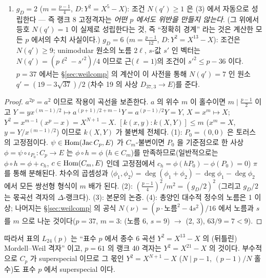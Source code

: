 \begin{proposition}[몫곡선 사전]
\begin{enumerate}
\item $g_D=2$ ($m=\tfrac{p-1}4$, $D:Y^2=X^5-X$): 조건 $N(q')\ge1$ 은 (3) 에서 자동으로 성립한다 --- 즉 랭크 8 고정격자는 \emph{어떤 $p$ 에서도 위반을 만들지 않는다}. (그 위에서 등호 $N(q')=1$ 이 실제로 성립한다는 것, 즉 ``정확히 경계'' 라는 것은 계산한 모든 $p$ 에서의 수치 사실이다.) $g_D=6$ ($m=\tfrac{p-1}{12}$, $D:Y^2=X^{13}-X$): 조건은 $N(q')\ge9$; unimodular 원소의 노름 $2\ell$, $s$-값 $s'$ 인 벡터는 $N(q')=(p\ell^2-s'^2)/4$ 이므로 근($\ell=1$)의 조건이 $s'^2\le p-36$ 이다. $p=37$ 에서는 \S\ref{sec:weilcomp} 의 계산이 이 사전을 통해 $N(q')=7$ 인 원소 $q'=(19-3\sqrt{37})/2$ (차수 19 의 사상 $D_{37,3}\to E$)를 준다.
\end{enumerate}
\end{proposition}
\begin{proof}
$a^{2p}=a^2$ 이므로 작용이 곡선을 보존한다. $a$ 의 위수 $m$ 이 홀수이면 $m\mid\tfrac{p-1}2$ 이고 $Y=yx^{(m-1)/2}\mapsto a^{(p+1)/2+m-1}Y=a^{(p-1)/2}Y=Y$, $X=x^m\mapsto X$; $Y^2=x^{m-1}(x^p-x)=X^{N+1}-X$. $[k(x,y):k(X,Y)]\le m$ ($x^m=X$, $y=Y/x^{(m-1)/2}$) 이므로 $k(X,Y)$ 가 불변체 전체다. (1): $P_0=(0,0)$ 은 토러스의 고정점이다. $\psi\in\operatorname{Hom}(\mathrm{Jac}\,C_p,E)$ 가 $C_m$-불변이면 $P_0$ 을 기준점으로 한 사상 $\phi=\psi\circ\iota_{P_0}:C_p\to E$ 는 $\phi\circ h=\phi$ ($h\in C_m$)를 만족하므로(일반적으로는 $\phi\circ h=\phi+c_h$, $c\in\operatorname{Hom}(C_m,E)$ 인데 고정점에서 $c_h=\phi(hP_0)-\phi(P_0)=0$) $\pi$ 를 통해 분해된다. 차수의 곱셈성과 $\langle\phi_1,\phi_2\rangle=\deg(\phi_1+\phi_2)-\deg\phi_1-\deg\phi_2$ 에서 모든 쌍선형 형식이 $m$ 배가 된다. (2): $(\tfrac{p-1}4)^2/m^2=(g_D/2)^2$ (그리고 $g_D/2$ 는 몫곡선 격자의 $\Delta$-랭크다). (3): 본문의 논증. (4): 총양인 대수적 정수의 노름은 1 이상; 나머지는 \S\ref{sec:weilcomp} 의 공식 $N(\nu)=(p\cdot\text{노름}^2-4s^2)/16$ 에서 노름과 $s$ 를 $m$ 으로 나눈 것이다($p=37$, $m=3$: (노름 6, $s=9$) $\to$ (2, 3), $63/9=7<9$).
\end{proof}
따라서 표의 $L_{24}(p)$ 는 ``표수 $p$ 에서 종수 6 곡선 $Y^2=X^{13}-X$ 의 (뒤틀린) Mordell--Weil 격자'' 이고, $p=61$ 의 랭크 40 격자는 $Y^2=X^{21}-X$ 의 것이다. 부수적으로 $C_p$ 가 superspecial 이므로 그 몫인 $Y^2=X^{N+1}-X$ ($N\mid p-1$, $(p-1)/N$ 홀수)도 표수 $p$ 에서 superspecial 이다.

